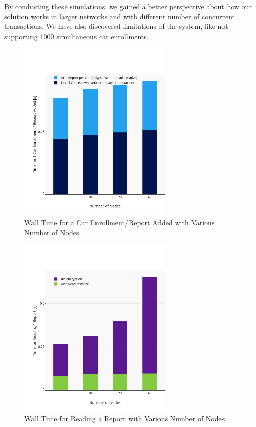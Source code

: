 \newline
By conducting these simulations, we gained a better perspective about how our solution works in larger networks and with different number of concurrent transactions. We have also discovered limitations of the system, like not supporting 1000 simultaneous car enrollments.
\newpage
\begin{figure}[H]
    \centering
    \includegraphics[width=0.65\textwidth, heigth=0.65\textwidth]{Sim/Wall-Time-Nodes-Enroll.png}
    \vspace{-20pt}
    \caption{Wall Time for a Car Enrollment/Report Added with Various Number of Nodes}
    \label{Wall Time Hosts Enroll}
\end{figure}
\vspace{-35pt}
\begin{figure}[H]
    \centering
    \includegraphics[width=0.65\textwidth, heigth=0.65\textwidth]{Sim/Wall-Time-Nodes-Read.png}
    \vspace{-20pt}
    \caption{Wall Time for Reading a Report with Various Number of Nodes}
    \label{Wall Time Hosts Read}
\end{figure}
